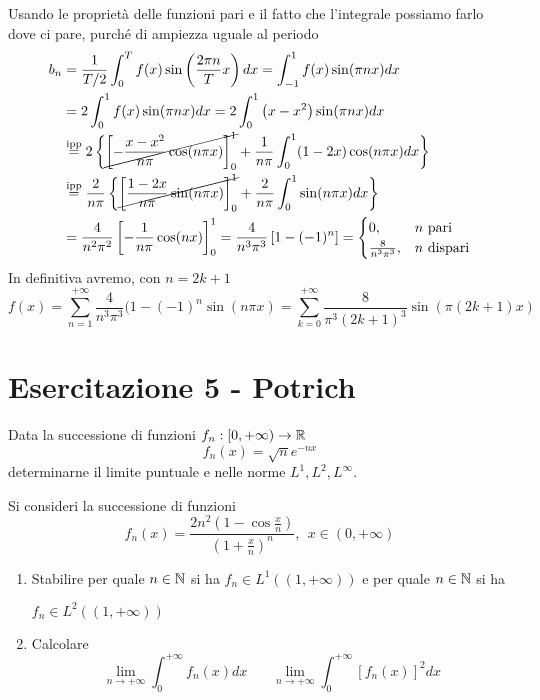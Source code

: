 Usando le proprietà delle funzioni pari e il fatto che l'integrale possiamo farlo dove ci pare, purché di ampiezza uguale al periodo
\begin{equation*}
\begin{aligned}
b_{n} & = \frac{1}{T/2}\int ^{T}_{0} f(x)\sin\left(\frac{2\pi n}{T} x\right) dx = \int ^{1}_{ - 1} f(x)\sin(\pi nx) dx\\
 & = 2\int ^{1}_{0} f(x)\sin(\pi nx) dx = 2\int ^{1}_{0}\left(x - x^{2}\right)\sin(\pi nx) dx\\
 & \overset{\text{ipp}}{ = } 2\left\{\cancel{\left[ - \frac{x - x^{2}}{n\pi }\cos(n\pi x)\right]^{1}_{0}} + \frac{1}{n\pi }\int ^{1}_{0}(1 - 2x)\cos(n\pi x) dx\right\}\\
 & \overset{\text{ipp}}{ = }\frac{2}{n\pi }\left\{\cancel{\left[\frac{1 - 2x}{n\pi }\sin(n\pi x)\right]^{1}_{0}} + \frac{2}{n\pi }\int ^{1}_{0}\sin(n\pi x) dx\right\}\\
 & = \frac{4}{n^{2} \pi ^{2}}\left[ - \frac{1}{n\pi }\cos (nx)\right]^{1}_{0} = \frac{4}{n^{3} \pi ^{3}}\left[ 1 - (- 1)^{n}\right] = 
 \begin{cases}
0, & n\ \text{pari}\\
\frac{8}{n^{3} \pi ^{3}} , & n\ \text{dispari}
\end{cases}
\end{aligned}
\end{equation*}
In definitiva avremo, con $n = 2k + 1$
\begin{equation*}
f(x) = \sum ^{ + \infty }_{n = 1}\frac{4}{n^{3} \pi ^{3}} (1 - (- 1)^{n}\sin (n\pi x) = \sum ^{ + \infty }_{k = 0}\frac{8}{\pi ^{3} (2k + 1)^{3}}\sin (\pi (2k + 1)x)
\end{equation*}
\chapter{Esercitazione 5 - Potrich}
\ParteEsercizi
\Esercizio{}

Data la successione di funzioni $f_{n} :[ 0, + \infty)\rightarrow \mathbb{R} $
\begin{equation*}
f_{n}(x) = \sqrt{n} e^{ - nx}
\end{equation*}
determinarne il limite puntuale e nelle norme $L^{1} ,L^{2} ,L^{\infty }$.
\Esercizio{}

Si consideri la successione di funzioni
\begin{equation*}
f_{n} (x) = \frac{2n^{2}\left(1 - \cos\frac{x}{n}\right)}{\left(1 + \frac{x}{n}\right)^{n}} ,\ \ x\in (0, + \infty)
\end{equation*}
\begin{enumerate}
\item Stabilire per quale $n\in \mathbb{N} $ si ha $f_{n} \in L^{1}((1, + \infty))$ e per quale $n\in \mathbb{N} $ si ha 

$f_{n} \in L^{2}((1, + \infty))$
\item Calcolare
\begin{equation*}
\lim\limits _{n\rightarrow + \infty }\int ^{ + \infty }_{0} f_{n}(x) dx\ \ \ \ \ \ \ \ \lim\limits _{n\rightarrow + \infty }\int ^{ + \infty }_{0}[ f_{n}(x)]^{2} dx
\end{equation*}
\end{enumerate}
\Esercizio{}

